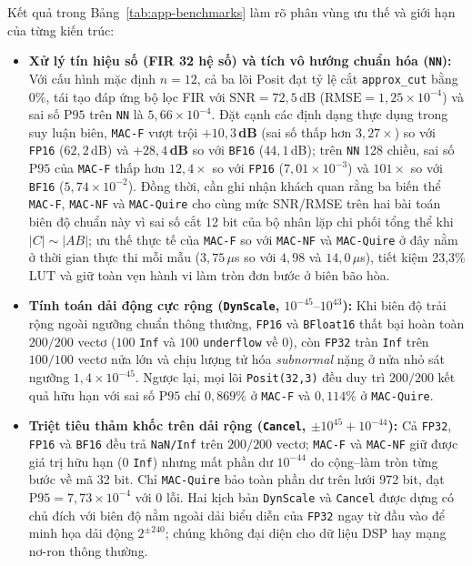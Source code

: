 

Kết quả trong Bảng~\ref{tab:app-benchmarks} làm rõ phân vùng ưu thế và giới hạn
của từng kiến trúc:
\begin{itemize}
  \item \textbf{Xử lý tín hiệu số (FIR 32 hệ số) và tích vô hướng chuẩn hóa (\texttt{NN}):}
        Với cấu hình mặc định $n=12$, cả ba lõi Posit đạt tỷ lệ cắt \texttt{approx\_cut}
        bằng $0\%$, tái tạo đáp ứng bộ lọc FIR với $\mathrm{SNR} = 72{,}5$\,dB ($\mathrm{RMSE} = 1{,}25{\times}10^{-4}$)
        và sai số $\mathrm{P95}$ trên \texttt{NN} là $5{,}66{\times}10^{-4}$. Đặt cạnh
        các định dạng thực dụng trong suy luận biên, \texttt{MAC-F} vượt trội
        \textbf{$+10{,}3$\,dB} (sai số thấp hơn $3{,}27\times$) so với \texttt{FP16}
        ($62{,}2$\,dB) và \textbf{$+28{,}4$\,dB} so với \texttt{BF16} ($44{,}1$\,dB);
        trên \texttt{NN} 128 chiều, sai số $\mathrm{P95}$ của \texttt{MAC-F} thấp
        hơn \textbf{$12{,}4\times$} so với \texttt{FP16} ($7{,}01{\times}10^{-3}$)
        và \textbf{$101\times$} so với \texttt{BF16} ($5{,}74{\times}10^{-2}$).
        Đồng thời, cần ghi nhận khách quan rằng ba biến thể \texttt{MAC-F},
        \texttt{MAC-NF} và \texttt{MAC-Quire} cho cùng mức SNR/RMSE trên hai bài
        toán biên độ chuẩn này vì sai số cắt 12 bit của bộ nhân lặp chi phối tổng
        thể khi $|C|\sim |AB|$; ưu thế thực tế của \texttt{MAC-F} so với
        \texttt{MAC-NF} và \texttt{MAC-Quire} ở đây nằm ở thời gian thực thi mỗi
        mẫu ($3{,}75\,\mu$s so với $4{,}98$ và $14{,}0\,\mu$s), tiết kiệm 23,3\%
        LUT và giữ toàn vẹn hành vi làm tròn đơn bước ở biên bão hòa.
  \item \textbf{Tính toán dải động cực rộng (\texttt{DynScale}, $10^{-45}\text{--}10^{43}$):}
        Khi biên độ trải rộng ngoài ngưỡng chuẩn thông thường, \texttt{FP16} và
        \texttt{BFloat16} thất bại hoàn toàn $200/200$ vectơ ($100$ \texttt{Inf}
        và $100$ \texttt{underflow} về $0$), còn \texttt{FP32} tràn \texttt{Inf}
        trên $100/100$ vectơ nửa lớn và chịu lượng tử hóa \textit{subnormal} nặng
        ở nửa nhỏ sát ngưỡng $1{,}4{\times}10^{-45}$. Ngược lại, mọi lõi \texttt{Posit(32,3)}
        đều duy trì $200/200$ kết quả hữu hạn với sai số $\mathrm{P95}$ chỉ $0{,}869\%$
        ở \texttt{MAC-F} và $0{,}114\%$ ở \texttt{MAC-Quire}.
  \item \textbf{Triệt tiêu thảm khốc trên dải rộng (\texttt{Cancel}, $\pm 10^{45} + 10^{-44}$):}
        Cả \texttt{FP32}, \texttt{FP16} và \texttt{BF16} đều trả \texttt{NaN/Inf}
        trên $200/200$ vectơ; \texttt{MAC-F} và \texttt{MAC-NF} giữ được giá trị
        hữu hạn ($0$ \texttt{Inf}) nhưng mất phần dư $10^{-44}$ do cộng--làm tròn
        từng bước về mã 32 bit. Chỉ \texttt{MAC-Quire} bảo toàn phần dư trên lưới
        972 bit, đạt $\mathrm{P95} = 7{,}73{\times}10^{-4}$ với $0$ lỗi. Hai kịch
        bản \texttt{DynScale} và \texttt{Cancel} được dựng có chủ đích với biên
        độ nằm ngoài dải biểu diễn của \texttt{FP32} ngay từ đầu vào để minh họa
        dải động $2^{\pm 240}$; chúng không đại diện cho dữ liệu DSP hay mạng
        nơ-ron thông thường.
\end{itemize}

